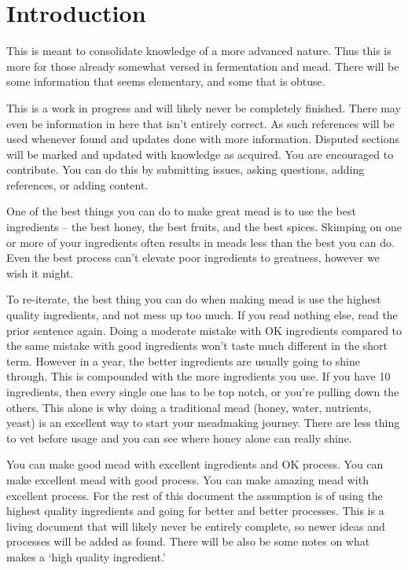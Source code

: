 \section{Introduction}
 This is meant to consolidate knowledge of a more advanced nature. Thus this is more for those already somewhat 
 versed in fermentation and mead. There will be some information that seems elementary, and some that is obtuse.

 This is a work in progress and will likely never be completely finished. There may even be information in
 here that isn't entirely correct. As such references will be used whenever found and updates done with more 
 information. Disputed sections will be marked and updated with knowledge as acquired. You are encouraged to 
 contribute. You can do this by submitting issues, asking questions, adding references, or adding content.

 One of the best things you can do to make great mead is to use the best ingredients -- the best honey, the best 
 fruits, and the best spices. Skimping on one or more of your ingredients often results in meads less than the 
 best you can do. Even the best process can't elevate poor ingredients to greatness, however we wish it might.

 To re-iterate, the best thing you can do when making mead is use the highest quality ingredients, and not mess
 up too much. If you read nothing else, read the prior sentence again. Doing a moderate mistake with OK ingredients
 compared to the same mistake with good ingredients won't taste much different in the short term. However in a
 year, the better ingredients are usually going to shine through. This is compounded with the more ingredients you
 use. If you have 10 ingredients, then every single one has to be top notch, or you're pulling down the others.
 This alone is why doing a traditional mead (honey, water, nutrients, yeast) is an excellent way to start your
 meadmaking journey. There are less thing to vet before usage and you can see where honey alone can really shine.

 You can make good mead with excellent ingredients and OK process. You can make excellent mead with good process. You
 can make amazing mead with excellent process. For the rest of this document the assumption is of using the highest
 quality ingredients and going for better and better processes. This is a living document that will likely never 
 be entirely complete, so newer ideas and processes will be added as found.
 There will be also be some notes on what makes a `high quality ingredient.'

 